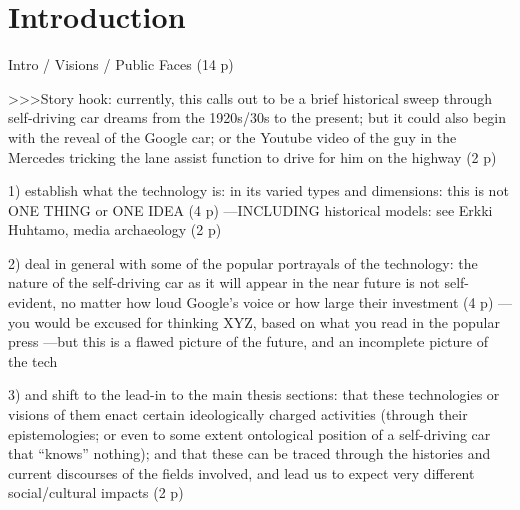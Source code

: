 \chapter{Introduction}

Intro / Visions / Public Faces (14 p)

>>>Story hook: currently, this calls out to be a brief historical
sweep through self-driving car dreams from the 1920s/30s to the
present; but it could also begin with the reveal of the Google car; or
the Youtube video of the guy in the Mercedes tricking the lane assist
function to drive for him on the highway (2 p)

1) establish what the technology is: in its varied types and
dimensions: this is not ONE THING or ONE IDEA (4 p)
---INCLUDING historical models: see Erkki Huhtamo, media archaeology
(2 p)

2) deal in general with some of the popular portrayals of the
technology: the nature of the self-driving car as it will appear in
the near future is not self-evident, no matter how loud Google's voice
or how large their investment (4 p)
---you would be excused for thinking XYZ, based on what you read in
the popular press
---but this is a flawed picture of the future, and an incomplete
picture of the tech

3) and shift to the lead-in to the main thesis sections: that these
technologies or visions of them enact certain ideologically charged
activities (through their epistemologies; or even to some extent
ontological position of a self-driving car that ``knows'' nothing);
and that these can be traced through the histories and current
discourses of the fields involved, and lead us to expect very
different social/cultural impacts (2 p)


